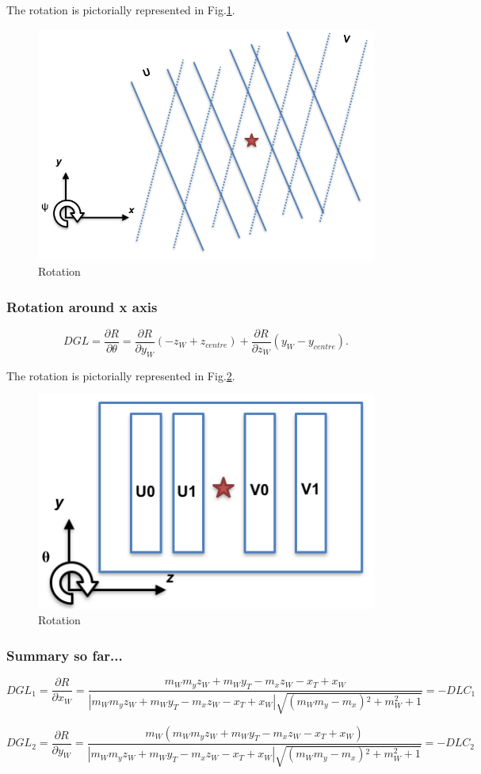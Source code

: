 \documentclass[a4paper,11pt]{article}
\begin{document}
The rotation is pictorially represented in Fig.\ref{fig:psi}.
\begin{figure}[!ht]
\centering
\includegraphics[width=0.4\linewidth]{fig/psi.png}
\caption{Rotation}
\label{fig:psi}
\end{figure}


\subsubsection{Rotation around x axis}

\begin{equation}
DGL = \frac{ \partial R}{\partial \theta} = \frac{ \partial R}{\partial y_W} (-z_W + z_{centre}) + \frac{ \partial R}{\partial z_W} (y_W - y_{centre}).
\end{equation}


The rotation is pictorially represented in Fig.\ref{fig:theta}.
\begin{figure}[!ht]
\centering
\includegraphics[width=0.4\linewidth]{fig/theta.png}
\caption{Rotation}
\label{fig:theta}
\end{figure}

\subsubsection{Summary so far...}


\begin{equation}	
DGL_1 = \frac{\partial R}{\partial x_W} = \frac{m_W m_y z_W+m_W y_T-m_x z_W-x_T+x_W}{|m_W m_y z_W+m_W y_T-m_x z_W-x_T+x_W|\sqrt{\left(m_W m_y-m_x\right){}^2+m_W^2+1}} = - DLC_1
\end{equation}

\begin{equation}	
DGL_2 = \frac{\partial R}{\partial y_W} = \frac{m_W (m_W m_y z_W+m_W y_T-m_x z_W-x_T+x_W)}{|m_W m_y z_W+m_W y_T-m_x z_W-x_T+x_W|\sqrt{\left(m_W m_y-m_x\right){}^2+m_W^2+1}}  = - DLC_2
\end{equation}
\end{document}
